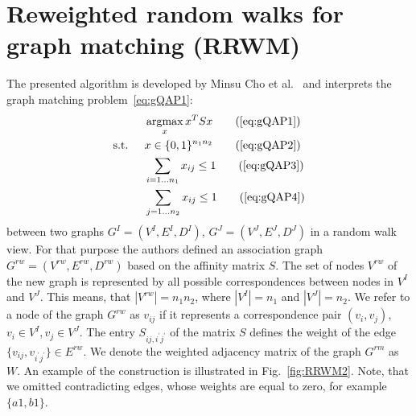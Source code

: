 \chapter{Reweighted random walks for graph matching (RRWM)}\label{appendixB} 

The presented algorithm is developed by Minsu Cho et al.~\cite{Cho2010_RRWM} and interprets the graph matching problem~\eqref{eq:gQAP1}:
\begin{alignat*}{2}
&     && \argmax_x{x^TSx}                           \tag{\ref{eq:gQAP1}}\\
& \text{s.t. } &&  x\in \{0,1\}^{n_1n_2}            \tag{\ref{eq:gQAP2}}\\
&             &&  \sum_{i=1\dots n_1} x_{ij}\le 1   \tag{\ref{eq:gQAP3}}\\
&             &&  \sum_{j=1\dots n_2} x_{ij}\le 1   \tag{\ref{eq:gQAP4}}
\end{alignat*}
between two graphs $G^I=(V^I,E^I,D^I)$, $G^J=(V^J,E^J,D^J)$ in a random walk view. For that purpose the authors defined an association graph $G^{rw}=(V^{rw},E^{rw},D^{rw})$ based on the affinity matrix $S$. The set of nodes $V^{rw}$ of the new graph is represented by all possible correspondences between nodes in $V^I$ and $V^J$. This means, that $|V^{rw}|=n_1n_2$, where $|V^I|=n_1$ and $|V^J|=n_2$. We refer to a node of the graph $G^{rw}$ as $v_{ij}$ if it represents a correspondence pair $(v_i,v_j)$, $v_i\in V^I,v_j\in V^J$. The entry $S_{ij,i^\prime j^\prime}$ of the matrix $S$ defines the weight of the edge $\{v_{ij},v_{i^\prime j^\prime}\}\in E^{rw}$. We denote the weighted adjacency matrix of the graph $G^{rm}$ as $W$. An example of the construction is illustrated in Fig.~\ref{fig:RRWM2}. Note, that we omitted contradicting edges, whose weights are equal to zero, for example $\{a1,b1\}$.

